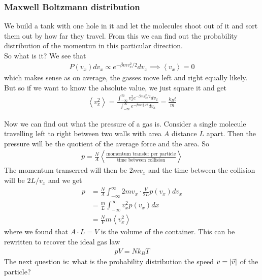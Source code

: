\subsubsection{Maxwell Boltzmann distribution}
We build a tank with one hole in it and let the molecules shoot out of it and sort them out by how far they travel. From this we can find out the probability distribution of the momentun in this particular direction.\\


So what is it? We see that
\begin{align*}
	P(v_x) dv_x \propto e^{-\beta mv_x^2/2}dv_x \implies \left<v_x\right> = 0
\end{align*}
which makes sense as on average, the gasses move left and right equally likely. But so if we want to know the absolute value, we just square it and get
\begin{align*}
	\left<v_x^2\right> = \frac{\int_{-\infty}^{\infty}v_x^2 e^{-\beta mv_x^2/2}dv_x}{\int_{-\infty}^{\infty}e^{-\beta mv_x^2/2}dv_x} = \frac{k_B t}{m}
\end{align*}

Now we can find out what the pressure of a gas is. Consider a single molecule travelling left to right between two walls with area $A$ distance $L$ apart. Then the pressure will be the quotient of the average force and the area. So
\begin{align*}
	p = \frac{N}{A} \left<\frac{\text{momentum transfer per particle}}{\text{time between collision}}\right>
\end{align*}
The momentum transerred will then be $2mv_x$ and the time between the collision will be $2L/v_x$ and we get
\begin{align*}
	p &= \frac{N}{A} \int_{-\infty}^{\infty}2mv_x \cdot \frac{V}{2L}p(v_x) dv_x \\
		&= \frac{m}{L}\int_{-\infty}^{\infty}v_x^2p(v_x) dx\\
		&= \frac{N}{V}m \left<v_x^2\right>
\end{align*}
where we found that $A \cdot L = V$ is the volume of the container. This can be rewritten to recover the ideal gas law
\begin{align*}
	pV = Nk_B T
\end{align*}
The next question is: what is the probability distribution the speed $v = \vert\vec{v}\vert$ of the particle?


